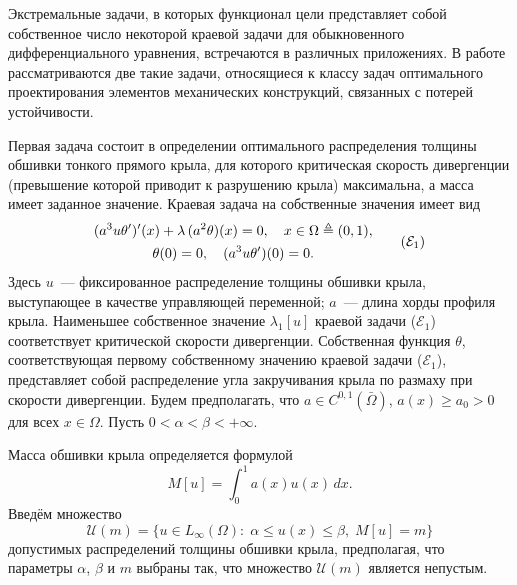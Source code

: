 \vzmscaption



\par
Экстремальные задачи, в которых функционал цели
\linebreak
представляет
собой собственное число
некоторой краевой задачи для обыкновенного дифференциального уравнения,
встречаются в различных приложениях.
%
%
%
В работе рассматриваются две такие задачи, относящиеся к классу задач оптимального проектирования
элементов механических конструкций, связанных с потерей устойчивости.
%
%
%
%
%
\par
Первая задача состоит в определении оптимального распределения толщины обшивки тонкого прямого
крыла,
для которого критическая скорость дивергенции
(превышение которой приводит к разрушению крыла)
максимальна, а масса имеет заданное значение.
%
%
%
Краевая задача на собственные значения имеет вид
\[
\begin{gathered}
(a^3 u \theta')'(x) + \lambda \, (a^2 \theta)(x) = 0,
\quad
x \in \Omega \triangleq (0, 1),
\\
\theta(0) = 0,
\quad
(a^3 u \theta')(0) = 0.
\end{gathered}
\tag{$\mathcal{E}_1$}
\]
Здесь
$u$~--- фиксированное распределение толщины обшивки крыла,
выступающее в качестве управляющей переменной;
$a$~--- длина хорды профиля крыла.
%
%
%
Наименьшее собственное значение $\lambda_1[u]$ краевой задачи
($\mathcal{E}_1$)
соответствует критической
скорости дивергенции.
%
%
%
Собственная функция $\theta$,
соответствующая первому собственному
значению краевой задачи
($\mathcal{E}_1$),
представляет собой распределение угла закручивания крыла по
размаху при скорости дивергенции.
%
%
%
Будем предполагать,
что
$a \in C^{0, 1}(\bar{\Omega})$, $a(x) \geq a_0 > 0$ для всех $x \in \Omega$.
%
%
%
Пусть
$0 < \alpha < \beta < +\infty$.
%
%
%
%
%
\par
Масса обшивки крыла определяется формулой
\[
M[u] = \int_0^1 a(x) u(x) \, dx.
\]
Введём множество
\[
\mathcal{U}(m)
=
\{
u \in L_\infty(\Omega) :
\;
\alpha \leq u(x) \leq \beta,
\;
M[u] = m
\}
\]
допустимых распределений толщины обшивки крыла,
предполагая, что параметры $\alpha$, $\beta$ и $m$
выбраны так, что множество $\mathcal{U}(m)$ является непустым.
%
%
%
